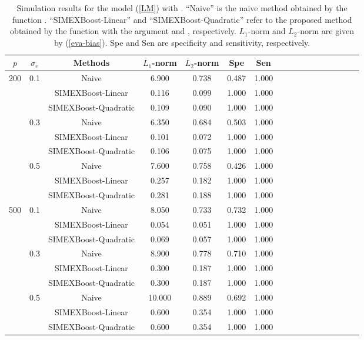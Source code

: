  \begin{table}[!ht]
       \huge
     \caption{Simulation results for the model (\ref{LM}) with . ``Naive'' is the naive method obtained by the function . ``SIMEXBoost-Linear'' and ``SIMEXBoost-Quadratic'' refer to the proposed method obtained by the function  with the argument  and , respectively. $L_1$-norm and $L_2$-norm are given by (\ref{eva-bias}). Spe and Sen are specificity and sensitivity, respectively. } \label{tab:Sim-1}


 \scriptsize

\center
 \begin{tabular}{c c c c  ccccccccccccc}


 \hline
$p$  & $\sigma_e$  & Methods & $L_1$-norm & $L_2$-norm & Spe & Sen \\
\hline
200 & 0.1 & Naive & 6.900 & 0.738 & 0.487 & 1.000 \\
 &  & SIMEXBoost-Linear & 0.116 & 0.099 & 1.000 & 1.000 \\
 &  & SIMEXBoost-Quadratic & 0.109 & 0.090 & 1.000 & 1.000 \\
 & 0.3 & Naive & 6.350 & 0.684 & 0.503 & 1.000 \\
 &  & SIMEXBoost-Linear & 0.101 & 0.072 & 1.000 & 1.000 \\
 &  & SIMEXBoost-Quadratic & 0.106 & 0.075 & 1.000 & 1.000 \\
 & 0.5 & Naive & 7.600 & 0.758 & 0.426 & 1.000 \\
 &  & SIMEXBoost-Linear & 0.257 & 0.182 & 1.000 & 1.000 \\
 &  & SIMEXBoost-Quadratic & 0.281 & 0.188 & 1.000 & 1.000 \\ \hline
500 & 0.1 & Naive & 8.050 & 0.733 & 0.732 & 1.000 \\
 &  & SIMEXBoost-Linear & 0.054 & 0.051 & 1.000 & 1.000 \\
 &  & SIMEXBoost-Quadratic & 0.069 & 0.057 & 1.000 & 1.000 \\
 & 0.3 & Naive & 8.900 & 0.778 & 0.710 & 1.000 \\
 &  & SIMEXBoost-Linear & 0.300 & 0.187 & 1.000 & 1.000 \\
 &  & SIMEXBoost-Quadratic & 0.300 & 0.187 & 1.000 & 1.000 \\
 & 0.5 & Naive & 10.000 & 0.889 & 0.692 & 1.000 \\
 &  & SIMEXBoost-Linear & 0.600 & 0.354 & 1.000 & 1.000 \\
 &  & SIMEXBoost-Quadratic & 0.600 & 0.354 & 1.000 & 1.000 \\

\hline    


\end{tabular}

\end{table}


